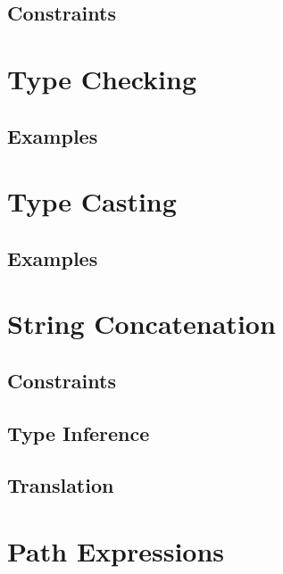\documentclass[a4paper,oneside,12pt, extrafontsizes]{memoir}
\begin{document}
    \section{Constraints}
    

  \chapter{Type Checking}
  \label{ch:type-checking}
  

    \section{Examples}
    

  \chapter{Type Casting}
  \label{ch:type-casting}
  

    \section{Examples}
    

  \chapter{String Concatenation}
  \label{ch:string-concatenation}
  

    \section{Constraints}
    

    \section{Type Inference}
    

    \section{Translation}
    

  \chapter{Path Expressions}
  \label{ch:paths}
  
\end{document}
